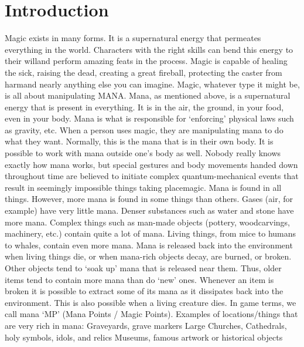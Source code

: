 \documentclass[twoside]{book}
\begin{document}
\section{Introduction}
      Magic exists in many forms. It is a supernatural
             energy that permeates everything in the world. Characters
             with the right skills can bend this energy to their
             willand perform amazing feats in the process. Magic
             is capable of healing the sick, raising the dead, creating a
             great fireball, protecting the caster from harmand
             nearly anything else you can imagine.   Magic, whatever type it might be, is all about
             manipulating MANA. Mana, as mentioned above, is a
             supernatural energy that is present in everything. It is in
             the air, the ground, in your food, even in your body. Mana
             is what is responsible for `enforcing' physical
             laws such as gravity, etc. When a person uses magic, they
             are manipulating mana to do what they want. Normally, this
             is the mana that is in their own body. It is possible to
             work with mana outside one's body as well. Nobody
             really knows exactly how mana works, but special gestures
             and body movements handed down throughout time are believed
             to initiate complex quantum-mechanical events that result in
             seemingly impossible things taking placemagic.
               Mana is found in all things. However, more mana is
             found in some things than others. Gases (air, for example)
             have very little mana. Denser substances such as water and
             stone have more mana. Complex things such as man-made
             objects (pottery, woodcarvings, machinery, etc.) contain
             quite a lot of mana. Living things, from mice to humans to
             whales, contain even more mana. Mana is released back into
             the environment when living things die, or when mana-rich
             objects decay, are burned, or broken. Other objects tend to
             `soak up' mana that is released near them. Thus,
             older items tend to contain more mana than do
             `new' ones. Whenever an item is broken it is
             possible to extract some of its mana as it dissipates back
             into the environment. This is also possible when a living
             creature dies. In game terms, we call mana `MP'
             (Mana Points / Magic Points).   Examples of locations/things that are very rich in
             mana:   
              Graveyards, grave markers   
                Large Churches, Cathedrals, holy symbols, idols,
               and relics 
                Museums, famous artwork or historical objects
               
\end{document}
